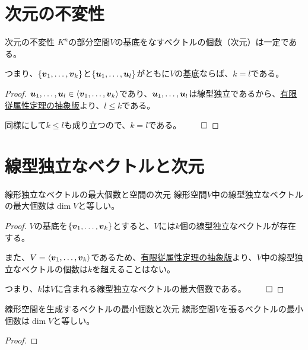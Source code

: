 \documentclass[../../../topic_linear-algebra]{subfiles}
\begin{document}
\sectionline
\section{次元の不変性}

\begin{theorem}{次元の不変性}
  $K^n$の部分空間$V$の基底をなすベクトルの個数（次元）は一定である。

  つまり、$\{ \vb*{v}_1, \dots, \vb*{v}_k \}$と$\{ \vb*{u}_1, \dots, \vb*{u}_l \}$がともに$V$の基底ならば、$k = l$である。
\end{theorem}

\begin{proof}
  $\vb*{u}_1, \dots, \vb*{u}_l \in \langle \vb*{v}_1, \dots, \vb*{v}_k \rangle$であり、$\vb*{u}_1, \dots, \vb*{u}_l$は線型独立であるから、\hyperref[thm:abstract-finite-dependency]{有限従属性定理の抽象版}より、$l \leq k$である。

  同様にして$k \leq l$も成り立つので、$k = l$である。 $\qed$
\end{proof}

\sectionline
\section{線型独立なベクトルと次元}

\begin{theorem}{線形独立なベクトルの最大個数と空間の次元}
  線形空間$V$中の線型独立なベクトルの最大個数は$\dim V$と等しい。
\end{theorem}

\begin{proof}
  $V$の基底を$\{ \vb*{v}_1,\dots, \vb*{v}_k \}$とすると、$V$には$k$個の線型独立なベクトルが存在する。

  また、$V = \langle \vb*{v}_1, \dots, \vb*{v}_k \rangle$であるため、\hyperref[thm:abstract-finite-dependency]{有限従属性定理の抽象版}より、$V$中の線型独立なベクトルの個数は$k$を超えることはない。

  つまり、$k$は$V$に含まれる線型独立なベクトルの最大個数である。 $\qed$
\end{proof}

\sectionline

\begin{theorem}{線形空間を生成するベクトルの最小個数と次元}
  線形空間$V$を張るベクトルの最小個数は$\dim V$と等しい。
\end{theorem}

\begin{proof}
\end{proof}
\end{document}
